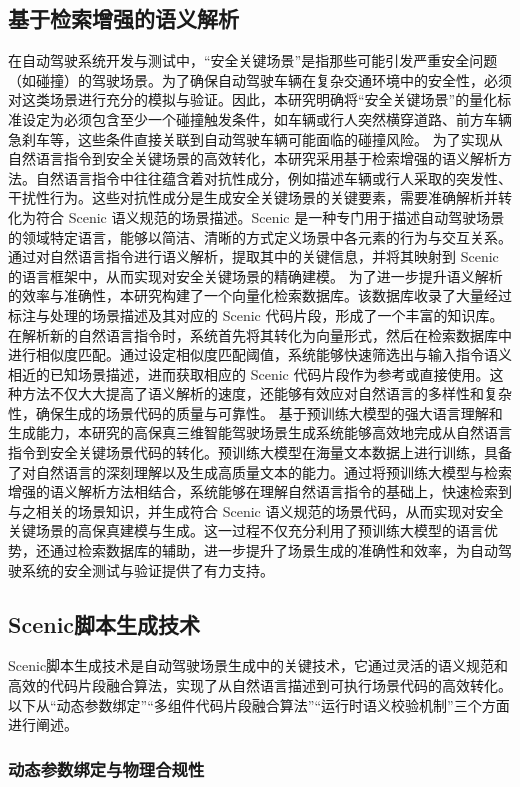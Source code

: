 \documentclass{article}
\begin{document}
\subsection{基于检索增强的语义解析}
在自动驾驶系统开发与测试中，“安全关键场景”是指那些可能引发严重安全问题（如碰撞）的驾驶场景。为了确保自动驾驶车辆在复杂交通环境中的安全性，必须对这类场景进行充分的模拟与验证。因此，本研究明确将“安全关键场景”的量化标准设定为必须包含至少一个碰撞触发条件，如车辆或行人突然横穿道路、前方车辆急刹车等，这些条件直接关联到自动驾驶车辆可能面临的碰撞风险。
为了实现从自然语言指令到安全关键场景的高效转化，本研究采用基于检索增强的语义解析方法。自然语言指令中往往蕴含着对抗性成分，例如描述车辆或行人采取的突发性、干扰性行为。这些对抗性成分是生成安全关键场景的关键要素，需要准确解析并转化为符合 Scenic 语义规范的场景描述。Scenic 是一种专门用于描述自动驾驶场景的领域特定语言，能够以简洁、清晰的方式定义场景中各元素的行为与交互关系。通过对自然语言指令进行语义解析，提取其中的关键信息，并将其映射到 Scenic 的语言框架中，从而实现对安全关键场景的精确建模。
为了进一步提升语义解析的效率与准确性，本研究构建了一个向量化检索数据库。该数据库收录了大量经过标注与处理的场景描述及其对应的 Scenic 代码片段，形成了一个丰富的知识库。在解析新的自然语言指令时，系统首先将其转化为向量形式，然后在检索数据库中进行相似度匹配。通过设定相似度匹配阈值，系统能够快速筛选出与输入指令语义相近的已知场景描述，进而获取相应的 Scenic 代码片段作为参考或直接使用。这种方法不仅大大提高了语义解析的速度，还能够有效应对自然语言的多样性和复杂性，确保生成的场景代码的质量与可靠性。
基于预训练大模型的强大语言理解和生成能力，本研究的高保真三维智能驾驶场景生成系统能够高效地完成从自然语言指令到安全关键场景代码的转化。预训练大模型在海量文本数据上进行训练，具备了对自然语言的深刻理解以及生成高质量文本的能力。通过将预训练大模型与检索增强的语义解析方法相结合，系统能够在理解自然语言指令的基础上，快速检索到与之相关的场景知识，并生成符合 Scenic 语义规范的场景代码，从而实现对安全关键场景的高保真建模与生成。这一过程不仅充分利用了预训练大模型的语言优势，还通过检索数据库的辅助，进一步提升了场景生成的准确性和效率，为自动驾驶系统的安全测试与验证提供了有力支持。


\subsection{Scenic脚本生成技术}
Scenic脚本生成技术是自动驾驶场景生成中的关键技术，它通过灵活的语义规范和高效的代码片段融合算法，实现了从自然语言描述到可执行场景代码的高效转化。以下从“动态参数绑定”“多组件代码片段融合算法”“运行时语义校验机制”三个方面进行阐述。
\subsubsection{动态参数绑定与物理合规性}
\end{document}
